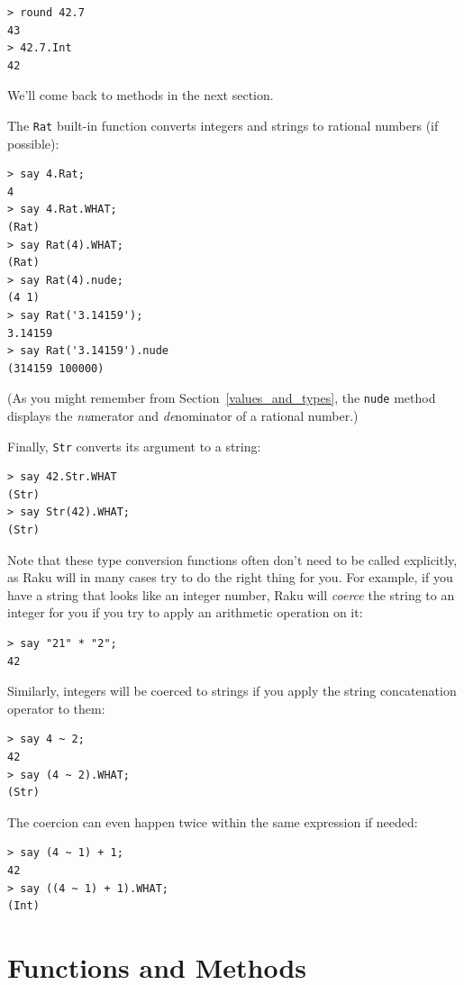 \begin{verbatim}
> round 42.7
43
> 42.7.Int
42
\end{verbatim}

We'll come back to methods in the next section.

The {\tt Rat} built-in function converts integers and 
strings to rational numbers (if possible):

\begin{verbatim}
> say 4.Rat;
4
> say 4.Rat.WHAT;
(Rat)
> say Rat(4).WHAT;
(Rat)
> say Rat(4).nude;
(4 1)
> say Rat('3.14159');
3.14159
> say Rat('3.14159').nude
(314159 100000)
\end{verbatim}
%
(As you might remember from Section~\ref{values_and_types}, 
the \verb'nude' method displays the \emph{nu}merator and 
\emph{de}nominator of a rational number.)

Finally, {\tt Str} converts its argument to a string:

\begin{verbatim}
> say 42.Str.WHAT
(Str)
> say Str(42).WHAT;
(Str)
\end{verbatim}

Note that these type conversion functions often don't need 
to be called explicitly, as Raku will in many cases try to do the 
right thing for you. For example, if you have a string 
that looks like an integer number, Raku will \emph{coerce} 
the string to an integer for you if you try to apply 
an arithmetic operation on it:

\begin{verbatim}
> say "21" * "2";
42
\end{verbatim}

Similarly, integers will be coerced to strings if you 
apply the string concatenation operator to them:

\begin{verbatim}
> say 4 ~ 2;
42
> say (4 ~ 2).WHAT;
(Str)
\end{verbatim}

The coercion can even happen twice within the same expression 
if needed:

\begin{verbatim}
> say (4 ~ 1) + 1;
42
> say ((4 ~ 1) + 1).WHAT;
(Int)
\end{verbatim}

\section{Functions and Methods}

